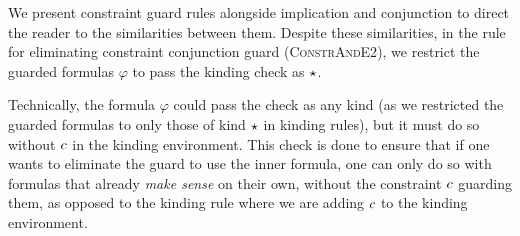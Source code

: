 \documentclass[english, mgr]{iithesis}
\renewcommand{\sc}[1]{\textsc{\small{#1}}}
\renewcommand{\it}[1]{\textit{#1}}
\begin{document}
We present constraint guard rules alongside implication and conjunction
to direct the reader to the similarities between them.
Despite these similarities,
in the rule for eliminating constraint conjunction guard (\sc{ConstrAndE2}),
we restrict the guarded formulas $\varphi$ to pass the kinding check as $\star$.

Technically, the formula $\varphi$ could pass the check as any kind
(as we restricted the guarded formulas to only those of kind $\star$ in kinding rules),
but it must do so without $c$ in the kinding environment.
This check is done to ensure that if one wants to eliminate the guard to use the inner formula,
one can only do so with formulas that already \it{make sense} on their own,
without the constraint $c$ guarding them, as opposed to the kinding rule
where we are adding $c$ to the kinding environment.

\newpage
\end{document}
